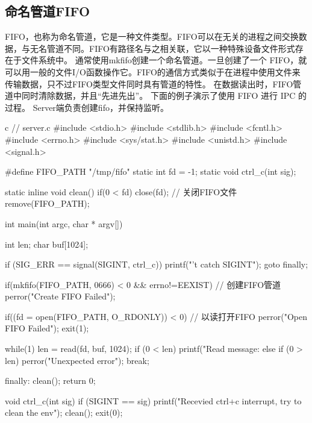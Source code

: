 \subsection{命名管道FIFO}
FIFO，也称为命名管道，它是一种文件类型。FIFO可以在无关的进程之间交换数据，与无名管道不同。FIFO有路径名与之相关联，它以一种特殊设备文件形式存在于文件系统中。
通常使用mkfifo创建一个命名管道。一旦创建了一个 FIFO，就可以用一般的文件I/O函数操作它。FIFO的通信方式类似于在进程中使用文件来传输数据，只不过FIFO类型文件同时具有管道的特性。
在数据读出时，FIFO管道中同时清除数据，并且“先进先出”。
下面的例子演示了使用 FIFO 进行 IPC 的过程。
Server端负责创建fifo，并保持监听。
\begin{code-block}{c}
// server.c
#include <stdio.h>
#include <stdlib.h>
#include <fcntl.h>
#include <errno.h>
#include <sys/stat.h>
#include <unistd.h>
#include <signal.h>

#define FIFO_PATH "/tmp/fifo"
static int fd = -1;
static void ctrl_c(int sig);

static inline void clean()
{
        if(0 < fd)
        {
                close(fd);  // 关闭FIFO文件
        }
        remove(FIFO_PATH);
}

int main(int argc, char * argv[])
{
        int len;
        char buf[1024];

        if (SIG_ERR == signal(SIGINT, ctrl_c))
        {
                printf("\ncan't catch SIGINT\n");
                goto finally;
        }

        if(mkfifo(FIFO_PATH, 0666) < 0 && errno!=EEXIST) // 创建FIFO管道
                perror("Create FIFO Failed");

        if((fd = open(FIFO_PATH, O_RDONLY)) < 0)  // 以读打开FIFO
        {
                perror("Open FIFO Failed");
                exit(1);
        }

        while(1)
        {
                len = read(fd, buf, 1024);
                if (0 < len)
                {
                        printf("Read message: %
                }
                else if (0 > len)
                {
                        perror("Unexpected error\n");
                        break;
                }
        }

finally:
        clean();
        return 0;
}

void ctrl_c(int sig)
{
        if (SIGINT == sig)
        {
                printf("Recevied ctrl+c interrupt, try to clean the env\n");
                clean();
                exit(0);
        }
}
\end{code-block}

